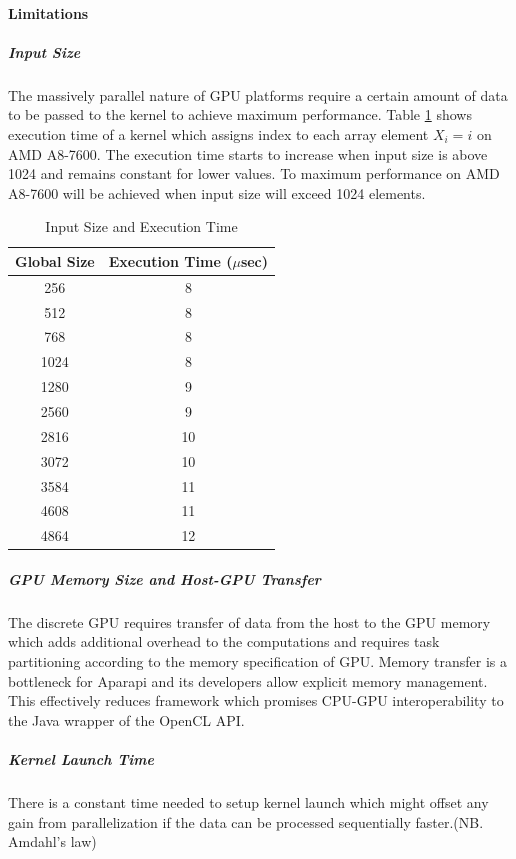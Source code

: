 \documentclass[]{report}
\begin{document}
\paragraph*{Limitations}
\subparagraph*{Input Size}
The massively parallel nature of GPU platforms require a certain amount of data to be passed to the kernel to achieve maximum performance. Table \ref{table:GlobalSize} shows execution time of a kernel which assigns index to each array element $ X_{i} = i $ on AMD A8-7600. The execution time starts to increase when input size is above 1024 and remains constant for lower values.
To maximum performance on AMD A8-7600 will be achieved when input size will exceed 1024 elements.
\begin{table}[htbp]

\begin{tabular}{|c|c|}
\hline 
Global Size & Execution Time ($\mu$sec) \\ 
\hline 
256 & 8 \\ 
\hline 
512 & 8 \\ 
\hline 
768 & 8 \\ 
\hline 
1024 & 8 \\ 
\hline 
1280 & 9 \\ 
\hline 
2560 & 9 \\ 
\hline 
2816 & 10 \\ 
\hline 
3072 & 10 \\
\hline 
3584 & 11 \\
\hline 
4608 & 11 \\
\hline 
4864 & 12 \\
\hline 
\end{tabular} 
\caption{Input Size and Execution Time}
\label{table:GlobalSize}   
\end{table}

\subparagraph*{GPU Memory Size and Host-GPU Transfer}
The discrete GPU requires transfer of data from the host to the GPU memory which adds additional overhead to the computations and requires task partitioning according to the memory specification of GPU\cite{Sismanis2012}. 
Memory transfer is a bottleneck for Aparapi and its developers allow explicit memory management\cite{Aparapi}. This effectively reduces framework which promises CPU-GPU interoperability to the Java wrapper of the OpenCL API.

\subparagraph*{Kernel Launch Time}
There is a constant time needed to setup kernel launch which might offset any gain from parallelization if the data can be processed sequentially faster.(NB. Amdahl's law)
\end{document}
